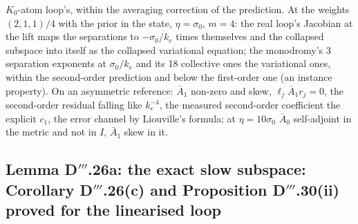 \begin{itemize}
    $K_0$-atom loop's, within the averaging correction of the prediction. At the weights $(2,1,1)/4$ with the prior in
    the state, $\eta=\sigma_0$, $m=4$: the real loop's Jacobian at the lift maps the separations to $-\sigma_0/k_e$
    times themselves and the collapsed subspace into itself as the collapsed variational equation; the monodromy's 3
    separation exponents at $\sigma_0/k_e$ and its 18 collective ones the variational ones, within the second-order
    prediction and below the first-order one (an instance property). On an asymmetric reference: $\bar A_1$ non-zero
    and skew, $\ell_j\bar A_1r_j=0$, the second-order residual falling like $k_e^{-4}$, the measured second-order
    coefficient the explicit $c_1$, the error channel by Liouville's formula; at $\eta=10\sigma_0$ $\bar A_0$
    self-adjoint in the metric and not in $I$, $\bar A_1$ skew in it.
\end{itemize}

\subsection{Lemma D\texorpdfstring{$'''$}{'''}.26a: the exact slow subspace: Corollary
D\texorpdfstring{$'''$}{'''}.26(c) and Proposition D\texorpdfstring{$'''$}{'''}.30(ii) proved for the linearised loop}

